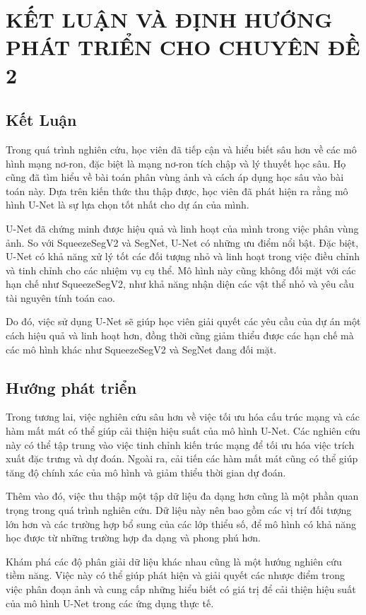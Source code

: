 \chapter{KẾT LUẬN VÀ ĐỊNH HƯỚNG PHÁT TRIỂN CHO CHUYÊN ĐỀ 2}
\section{Kết Luận}
Trong quá trình nghiên cứu, học viên đã tiếp cận và hiểu biết sâu hơn về các mô hình mạng nơ-ron, đặc biệt là mạng nơ-ron tích chập và lý thuyết học sâu. Họ cũng đã tìm hiểu về bài toán phân vùng ảnh và cách áp dụng học sâu vào bài toán này. Dựa trên kiến thức thu thập được, học viên đã phát hiện ra rằng mô hình U-Net là sự lựa chọn tốt nhất cho dự án của mình.

U-Net đã chứng minh được hiệu quả và linh hoạt của mình trong việc phân vùng ảnh. So với SqueezeSegV2 và SegNet, U-Net có những ưu điểm nổi bật. Đặc biệt, U-Net có khả năng xử lý tốt các đối tượng nhỏ và linh hoạt trong việc điều chỉnh và tinh chỉnh cho các nhiệm vụ cụ thể. Mô hình này cũng không đối mặt với các hạn chế như SqueezeSegV2, như khả năng nhận diện các vật thể nhỏ và yêu cầu tài nguyên tính toán cao.

Do đó, việc sử dụng U-Net sẽ giúp học viên giải quyết các yêu cầu của dự án một cách hiệu quả và linh hoạt hơn, đồng thời cũng giảm thiểu được các hạn chế mà các mô hình khác như SqueezeSegV2 và SegNet đang đối mặt.

\section{Hướng phát triển}


Trong tương lai, việc nghiên cứu sâu hơn về việc tối ưu hóa cấu trúc mạng và các hàm mất mát có thể giúp cải thiện hiệu suất của mô hình U-Net. Các nghiên cứu này có thể tập trung vào việc tinh chỉnh kiến trúc mạng để tối ưu hóa việc trích xuất đặc trưng và dự đoán. Ngoài ra, cải tiến các hàm mất mát cũng có thể giúp tăng độ chính xác của mô hình và giảm thiểu thời gian dự đoán.

Thêm vào đó, việc thu thập một tập dữ liệu đa dạng hơn cũng là một phần quan trọng trong quá trình nghiên cứu. Dữ liệu này nên bao gồm các vị trí đối tượng lớn hơn và các trường hợp bổ sung của các lớp thiểu số, để mô hình có khả năng học được từ những trường hợp đa dạng và phong phú hơn.

Khám phá các độ phân giải dữ liệu khác nhau cũng là một hướng nghiên cứu tiềm năng. Việc này có thể giúp phát hiện và giải quyết các nhược điểm trong việc phân đoạn ảnh và cung cấp những hiểu biết có giá trị để cải thiện hiệu suất của mô hình U-Net trong các ứng dụng thực tế.